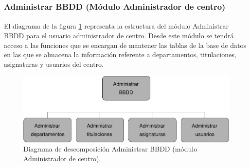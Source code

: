 \subsubsection{Administrar BBDD (Módulo Administrador de centro)}

  \paragraph{}El diagrama de la figura
  \ref{diagramaDescomposicionAdministrarBBDD-admCentro} representa la estructura
  del módulo Administrar BBDD para el usuario administrador de centro. Desde
  este módulo se tendrá acceso a las funciones que se encargan de mantener las
  tablas de la base de datos en las que se almacena la información referente a
  departamentos, titulaciones, asignaturas y usuarios del centro.

  \begin{figure}[!ht]
    \begin{center}
      \includegraphics[]{11.Disenyo_Arquitectonico/11.2.Diagramas_Descomposicion/11.2.3.Modulo_administrador_centro/AdministrarBBDD/Diagramas/administrar_bbdd.pdf}
      \caption{Diagrama de descomposición Administrar BBDD (módulo Administrador de centro).}
      \label{diagramaDescomposicionAdministrarBBDD-admCentro}
    \end{center}
  \end{figure}

 
 
 
 